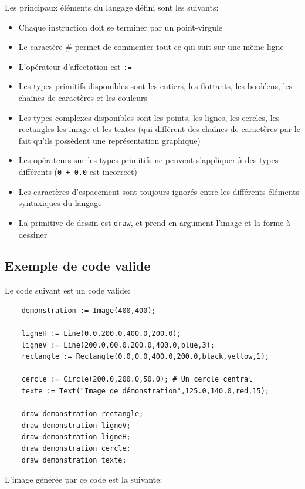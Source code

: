 \documentclass[a4paper, 12pt]{report}
\begin{document}
	Les principaux éléments du langage défini sont les suivants:\\
	
	\begin{itemize}
		\item Chaque instruction doit se terminer par un point-virgule
		\item Le caractère \# permet de commenter tout ce qui suit sur une même ligne
		\item L'opérateur d'affectation est \texttt{:=}
		\item Les types primitifs disponibles sont les entiers, les flottants, les booléens, les chaînes de caractères et les couleurs
		\item Les types complexes disponibles sont les points, les lignes, les cercles, les rectangles les image et les textes (qui diffèrent des chaînes de caractères par le fait qu'ils possèdent une représentation graphique)
		\item Les opérateurs sur les types primitifs ne peuvent s'appliquer à des types différents (\texttt{0 + 0.0} est incorrect)
		\item Les caractères d'espacement sont toujours ignorés entre les différents éléments syntaxiques du langage
		\item La primitive de dessin est \texttt{draw}, et prend en argument l'image et la forme à dessiner
	\end{itemize}
	
	\subsection{Exemple de code valide}
	
	Le code suivant est un code valide:
	
	\begin{verbatim}
	demonstration := Image(400,400);

	ligneH := Line(0.0,200.0,400.0,200.0);
	ligneV := Line(200.0,00.0,200.0,400.0,blue,3);
	rectangle := Rectangle(0.0,0.0,400.0,200.0,black,yellow,1);

	cercle := Circle(200.0,200.0,50.0); # Un cercle central
	texte := Text("Image de démonstration",125.0,140.0,red,15);

	draw demonstration rectangle;
	draw demonstration ligneV;
	draw demonstration ligneH;
	draw demonstration cercle;
	draw demonstration texte;
	\end{verbatim}
	
	L'image générée par ce code est la suivante:\\
	
\end{document}
